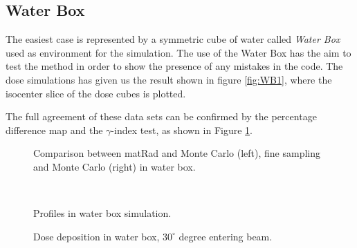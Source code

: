 \documentclass[12pt, a4paper, twoside]{book}
\begin{document}

\subsection{Water Box}
The easiest case is represented by a symmetric cube of water called \emph{Water Box} used as environment for the simulation. The use of the Water Box has the aim to test the method in order to show the presence of any mistakes in the code. 
The dose simulations has given us the result shown in figure \ref{fig:WB1}, where the isocenter slice of the dose cubes is plotted.



The full agreement of these data sets can be confirmed by the percentage difference map and the $\gamma$-index test, as shown in Figure \ref{fig:WB1gam}.
\begin{figure}[!ht]
\centering
{} 
\caption{Comparison between matRad and Monte Carlo (left), fine sampling and Monte Carlo (right) in water box.}
\label{fig:WB1gam}
\end{figure}

\begin{figure}[!t]
\centering
{} 
 \\
\caption{Profiles in water box simulation.}
\label{fig:WB1prof}
\vspace{-5mm}
\end{figure}
\begin{figure}[!ht]
\centering
{}\quad
{}\quad
{}\quad
\caption{Dose deposition in water box, $30^\circ$ degree entering beam.}
\label{fig:WB2}
\end{figure}
\end{document}
